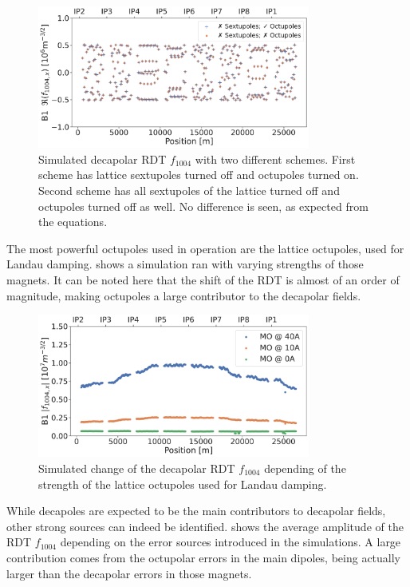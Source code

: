 \begin{figure}[!htb]
    \centering
    \includegraphics[width=0.8\textwidth]{./images/f1004/f1004_no_ms.pdf}
    \caption{Simulated decapolar RDT $f_{1004}$ with two different schemes. First scheme has
    lattice sextupoles turned off and octupoles turned on. Second scheme has all sextupoles of the
    lattice turned off and octupoles turned off as well. No difference is seen, as expected from
    the equations.}
    \label{fig:decapoles:rdts:sectupole_octupole_no_diff}
\end{figure}

The most powerful octupoles used in operation are the lattice octupoles, used for Landau damping.
 shows a simulation ran with varying strengths of
those magnets. It can be noted here that the shift of the RDT is almost of an order of magnitude,
making octupoles a large contributor to the decapolar fields.

\begin{figure}[!htb]
    \centering
    \includegraphics[width=0.8\textwidth]{./images/f1004/f1004_mo.pdf}
    \caption{Simulated change of the decapolar RDT $f_{1004}$ depending of the strength of the
    lattice octupoles used for Landau damping.}
    \label{fig:decapoles:rdts:simulation_mo_powered}
\end{figure}

While decapoles are expected to be the main contributors to decapolar fields, other strong sources
can indeed be identified.  shows the average amplitude of the
RDT $f_{1004}$ depending on the error sources introduced in the simulations. A large contribution
comes from the octupolar errors in the main dipoles, being actually larger than the decapolar errors
in those magnets.

